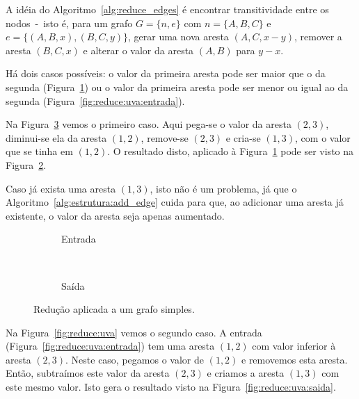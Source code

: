 \documentclass[12pt]{article}
\begin{document}
A idéia do Algoritmo~\ref{alg:reduce_edges} é encontrar transitividade entre os
nodos~-~isto é, para um grafo $G = \{n, e\}$ com $n = \{A, B, C\}$ e $e = \{(A, B, x),
  (B, C, y)\}$, gerar uma nova aresta $(A, C, x - y)$, remover a aresta $(B, C,
x)$ e alterar o valor da aresta $(A, B)$ para $y - x$.

Há dois casos possíveis: o valor da primeira aresta pode ser maior que o da
segunda (Figura~\ref{fig:reduce:abc:entrada}) ou o valor da primeira aresta pode
ser menor ou igual ao da segunda (Figura~\ref{fig:reduce:uva:entrada}).

Na Figura~\ref{fig:reduce:abc} vemos o primeiro caso. Aqui pega-se o valor da
aresta $(2,3)$, diminui-se ela da aresta $(1,2)$, remove-se $(2,3)$ e
cria-se $(1,3)$, com o valor que se tinha em $(1,2)$. O resultado disto, aplicado à
Figura~\ref{fig:reduce:abc:entrada} pode ser visto na Figura~\ref{fig:reduce:abc:saida}.

Caso já exista uma aresta $(1,3)$, isto não é um problema, já que o
Algoritmo~\ref{alg:estrutura:add_edge} cuida para que, ao adicionar uma aresta
já existente, o valor da aresta seja apenas aumentado.

\begin{figure}[H]
  \centering
  \begin{subfigure}[b]{0.5\textwidth}
    \begin{dot2tex}[neato,options=-tmath]
        
    \end{dot2tex}
    \caption{Entrada}
    \label{fig:reduce:abc:entrada}
  \end{subfigure}%
  ~
  \begin{subfigure}[b]{0.5\textwidth}
    \begin{dot2tex}[neato,options=-tmath]
        
    \end{dot2tex}
    \caption{Saída}
    \label{fig:reduce:abc:saida}
  \end{subfigure}
  \caption{Redução aplicada a um grafo simples.}
  \label{fig:reduce:abc}
\end{figure}

Na Figura~\ref{fig:reduce:uva} vemos o segundo caso. A entrada
(Figura~\ref{fig:reduce:uva:entrada}) tem uma aresta $(1,2)$ com valor inferior
à aresta $(2,3)$. Neste caso, pegamos o valor de $(1,2)$ e removemos esta
aresta. Então, subtraímos este valor da aresta $(2,3)$ e criamos a aresta
$(1,3)$ com este mesmo valor. Isto gera o resultado visto na
Figura~\ref{fig:reduce:uva:saida}.
\end{document}
